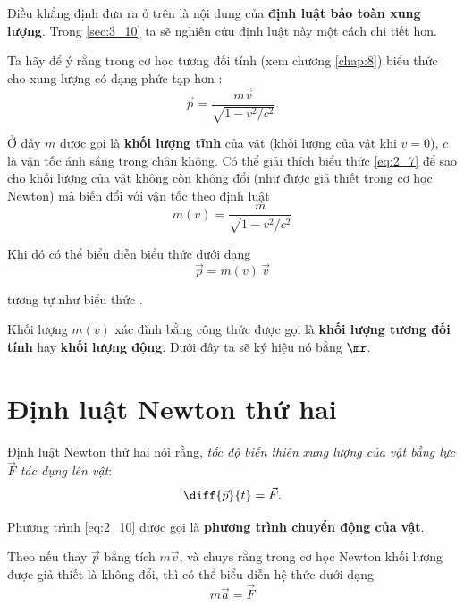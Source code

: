 \noindent
Điều khẳng định đưa ra ở trên là nội dung của \textbf{định luật bảo toàn xung lượng}. Trong \ref{sec:3_10} ta sẽ nghiên cứu định luật này một cách chi tiết hơn.

Ta hãy để ý rằng trong cơ học tương đối tính (xem chương \ref{chap:8}) biểu thức cho xung lượng có dạng phức tạp hơn :
\begin{equation}\label{eq:2_7}
\vec{p} = \frac{m \vec{v}}{\sqrt{1 - v^2/c^2}}.
\end{equation}

\noindent
Ở đây $m$ được gọi là \textbf{khối lượng tĩnh} của vật (khối lượng của vật khi $v=0$), $c$ là vận tốc ánh sáng trong chân không. Có thể giải thích biểu thức \eqref{eq:2_7} để sao cho khối lượng của vật không còn không đổi (như được giả thiết trong cơ học Newton) mà biến đổi với vận tốc theo định luật
\begin{equation}\label{eq:2_8}
m(v) = \frac{m}{\sqrt{1 - v^2/c^2}}
\end{equation}

\noindent
Khi đó có thể biểu diễn biểu thức  dưới dạng
\begin{equation}\label{eq:2_9}
\vec{p} = m(v)\,\vec{v}
\end{equation}

\noindent
tương tự như biểu thức .

Khối lượng $m(v)$ xác đình bằng công thức  được gọi là \textbf{khối lượng tương đối tính} hay \textbf{khối lượng động}. Dưới đây ta sẽ ký hiệu nó bằng $\mr$.

\section{Định luật Newton thứ hai}\label{sec:2_4}

Định luật Newton thứ hai nói rằng, \textit{tốc độ biến thiên xung lượng của vật bằng lực $\vec{F}$ tác dụng lên vật}:
\begin{equation}\label{eq:2_10}
\diff{\vec{p}}{t} = \vec{F}.
\end{equation}

\noindent
Phương trình \eqref{eq:2_10} được gọi là \textbf{phương trình chuyển động của vật}.

Theo  nếu thay $\vec{p}$ bằng tích $m\vec{v}$, và chuys rằng trong cơ học Newton khối lượng được giả thiết là không đổi, thì có thể biểu diễn hệ thức  dưới dạng
\begin{equation}\label{eq:2_11}
m\vec{a} = \vec{F}
\end{equation}

